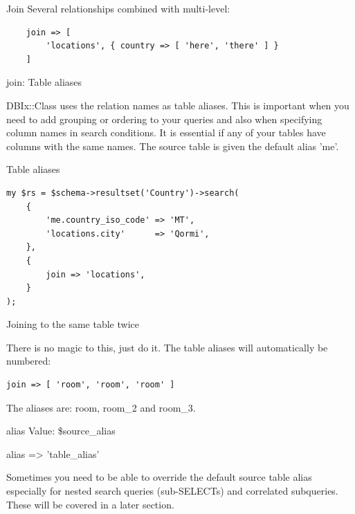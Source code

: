 \begin{frame}[fragile]{Join}
Several relationships combined with multi-level:

\begin{lstlisting}
    join => [
        'locations', { country => [ 'here', 'there' ] }
    ]
\end{lstlisting}
\end{frame}

join: Table aliases

DBIx::Class uses the relation names as table aliases. This is important when
you need to add grouping or ordering to your queries and also when
specifying column names in search conditions. It is essential if any of your
tables have columns with the same names. The source table is given the
default alias 'me'.

\begin{frame}[fragile]{Table aliases}
\begin{lstlisting}
my $rs = $schema->resultset('Country')->search(
    {
        'me.country_iso_code' => 'MT',
        'locations.city'      => 'Qormi',
    },
    {
        join => 'locations',
    }
);
\end{lstlisting}
\end{frame}

\begin{frame}[fragile]{Joining to the same table twice}

There is no magic to this, just do it. The table aliases will automatically
be numbered:

\begin{lstlisting}
join => [ 'room', 'room', 'room' ]
\end{lstlisting}

The aliases are: room, room\_2 and room\_3.
\end{frame}

\begin{frame}[fragile]{alias}
Value: \$source\_alias

    alias => 'table\_alias'

\end{frame}

Sometimes you need to be able to override the default source table alias especially for nested search queries (sub-SELECTs) and correlated subqueries. These will be covered in a later section.

